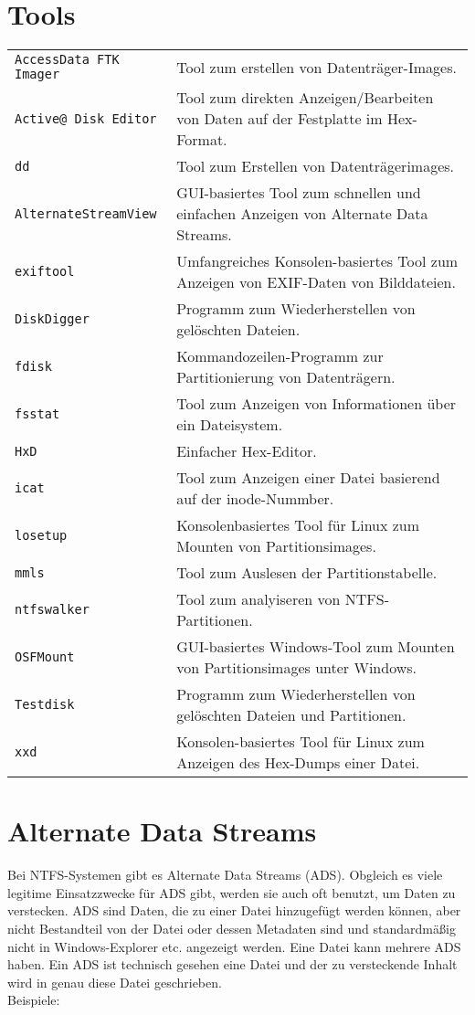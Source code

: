 \section{Tools}
\begin{tabular}{@{}p{\the\MyLen}
		@{}p{\linewidth-\the\MyLen}@{}}
	\texttt{AccessData FTK Imager} & Tool zum erstellen von Datenträger-Images.\\
	\texttt{Active@ Disk Editor} & Tool zum direkten Anzeigen/Bearbeiten von Daten auf der Festplatte im Hex-Format.\\
	\texttt{dd} & Tool zum Erstellen von Datenträgerimages.\\
	\texttt{Alternate\-Stream\-View} & GUI-basiertes Tool zum schnellen und einfachen Anzeigen von Alternate Data Streams.\\
	\texttt{exiftool} & Umfangreiches Konsolen-basiertes Tool zum Anzeigen von EXIF-Daten von Bilddateien.\\
	\texttt{DiskDigger} & Programm zum Wiederherstellen von gelöschten Dateien.\\
	\texttt{fdisk} & Kommandozeilen-Programm zur Partitionierung von Datenträgern.\\
	\texttt{fsstat} & Tool zum Anzeigen von Informationen über ein Dateisystem.\\
	\texttt{HxD} & Einfacher Hex-Editor.\\
	\texttt{icat} & Tool zum Anzeigen einer Datei basierend auf der inode-Nummber.\\
	\texttt{losetup} & Konsolenbasiertes Tool für Linux zum Mounten von Partitionsimages.\\
	\texttt{mmls} & Tool zum Auslesen der Partitionstabelle.\\
	\texttt{ntfswalker} & Tool zum analyiseren von NTFS-Partitionen.\\
	\texttt{OSFMount} & GUI-basiertes Windows-Tool zum Mounten von Partitionsimages unter Windows.\\
	\texttt{Testdisk} & Programm zum Wiederherstellen von gelöschten Dateien und Partitionen.\\
	\texttt{xxd} & Konsolen-basiertes Tool für Linux zum Anzeigen des Hex-Dumps einer Datei.\\
\end{tabular}
\section{Alternate Data Streams}
Bei NTFS-Systemen gibt es Alternate Data Streams (ADS). Obgleich es viele legitime Einsatzzwecke für ADS gibt, werden sie auch oft benutzt, um Daten zu verstecken. ADS sind Daten, die zu einer Datei hinzugefügt werden können, aber nicht Bestandteil von der Datei oder dessen Metadaten sind und standardmäßig nicht in Windows-Explorer etc. angezeigt werden. Eine Datei kann mehrere ADS haben. Ein ADS ist technisch gesehen eine Datei und der zu versteckende Inhalt wird in genau diese Datei geschrieben.\\
Beispiele:\\

